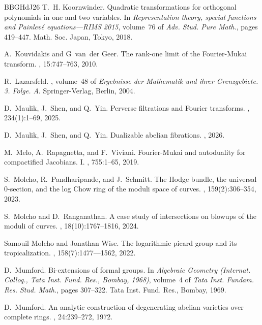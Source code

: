 \documentclass[11pt]{article}
\theoremstyle{definition}
\begin{document}
\begin{thebibliography}{BBGHdJ26}
T.~H. Koornwinder.
\newblock Quadratic transformations for orthogonal polynomials in one and two variables.
\newblock In {\em Representation theory, special functions and {P}ainlev\'e{} equations---{RIMS} 2015}, volume~76 of {\em Adv. Stud. Pure Math.}, pages 419--447. Math. Soc. Japan, Tokyo, 2018.

A.~Kouvidakis and G~van~der Geer.
\newblock The rank-one limit of the {F}ourier-{M}ukai transform.
, 15:747--763, 2010.

R.~Lazarsfeld.
, volume~48 of {\em Ergebnisse der Mathematik und ihrer Grenzgebiete. 3. Folge. A}.
\newblock Springer-Verlag, Berlin, 2004.

D.~Maulik, J.~Shen, and Q.~Yin.
\newblock Perverse filtrations and {F}ourier transforms.
, 234(1):1--69, 2025.

D.~Maulik, J.~Shen, and Q.~Yin.
\newblock Dualizable abelian fibrations.
, 2026.

M.~Melo, A.~Rapagnetta, and F.~Viviani.
\newblock Fourier-{M}ukai and autoduality for compactified {J}acobians. {I}.
, 755:1--65, 2019.

S.~Molcho, R.~Pandharipande, and J.~Schmitt.
\newblock The {H}odge bundle, the universal 0-section, and the log {C}how ring of the moduli space of curves.
, 159(2):306--354, 2023.

S.~Molcho and D.~Ranganathan.
\newblock A case study of intersections on blowups of the moduli of curves.
, 18(10):1767--1816, 2024.

Samouil Molcho and Jonathan Wise.
\newblock The logarithmic picard group and its tropicalization.
, 158(7):1477–--1562, 2022.

D.~Mumford.
\newblock Bi-extensions of formal groups.
\newblock In {\em Algebraic {G}eometry ({I}nternat. {C}olloq., {T}ata {I}nst. {F}und. {R}es., {B}ombay, 1968)}, volume~4 of {\em Tata Inst. Fundam. Res. Stud. Math.}, pages 307--322. Tata Inst. Fund. Res., Bombay, 1969.

D.~Mumford.
\newblock An analytic construction of degenerating abelian varieties over complete rings.
, 24:239--272, 1972.


\end{thebibliography}
\end{document}

